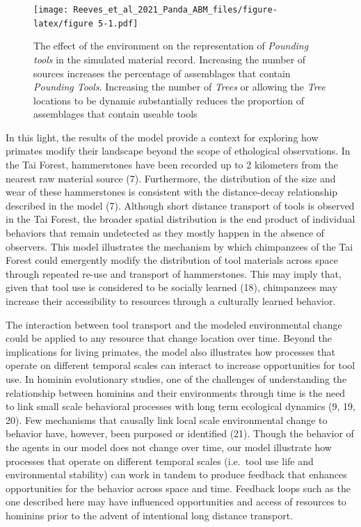 \documentclass[9pt,twocolumn,twoside,]{pnas-new}
\begin{document}
\begin{figure}
\centering
\texttt{[image: Reeves\_et\_al\_2021\_Panda\_ABM\_files/figure-latex/figure 5-1.pdf]}
\caption{The effect of the environment on the representation of
\emph{Pounding tools} in the simulated material record. Increasing the
number of sources increases the percentage of assemblages that contain
\emph{Pounding Tools}. Increasing the number of \emph{Trees} or allowing
the \emph{Tree} locations to be dynamic substantially reduces the
proportion of assemblages that contain useable tools
\label{pounding_tools}}
\end{figure}

In this light, the results of the model provide a context for exploring
how primates modify their landscape beyond the scope of ethological
observations. In the Tai Forest, hammerstones have been recorded up to 2
kilometers from the nearest raw material source (7). Furthermore, the
distribution of the size and wear of these hammerstones is consistent
with the distance-decay relationship described in the model (7).
Although short distance transport of tools is observed in the Tai
Forest, the broader spatial distribution is the end product of
individual behaviors that remain undetected as they mostly happen in the
absence of observers. This model illustrates the mechanism by which
chimpanzees of the Tai Forest could emergently modify the distribution
of tool materials across space through repeated re-use and transport of
hammerstones. This may imply that, given that tool use is considered to
be socially learned (18), chimpanzees may increase their accessibility
to resources through a culturally learned behavior.

The interaction between tool transport and the modeled environmental
change could be applied to any resource that change location over time.
Beyond the implications for living primates, the model also illustrates
how processes that operate on different temporal scales can interact to
increase opportunities for tool use. In hominin evolutionary studies,
one of the challenges of understanding the relationship between hominins
and their environments through time is the need to link small scale
behavioral processes with long term ecological dynamics (9, 19, 20). Few
mechanisms that causally link local scale environmental change to
behavior have, however, been purposed or identified (21). Though the
behavior of the agents in our model does not change over time, our model
illustrate how processes that operate on different temporal scales
(i.e.~tool use life and environmental stability) can work in tandem to
produce feedback that enhances opportunities for the behavior across
space and time. Feedback loops such as the one described here may have
influenced opportunities and access of resources to hominins prior to
the advent of intentional long distance transport.
\end{document}
